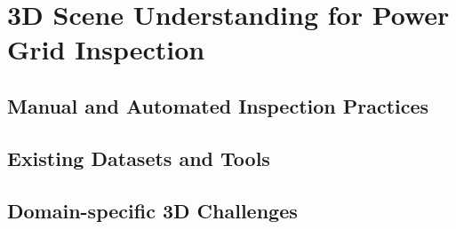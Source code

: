 \section{3D Scene Understanding for Power Grid Inspection}

\subsection{Manual and Automated Inspection Practices}

\subsection{Existing Datasets and Tools}

\subsection{Domain-specific 3D Challenges}


